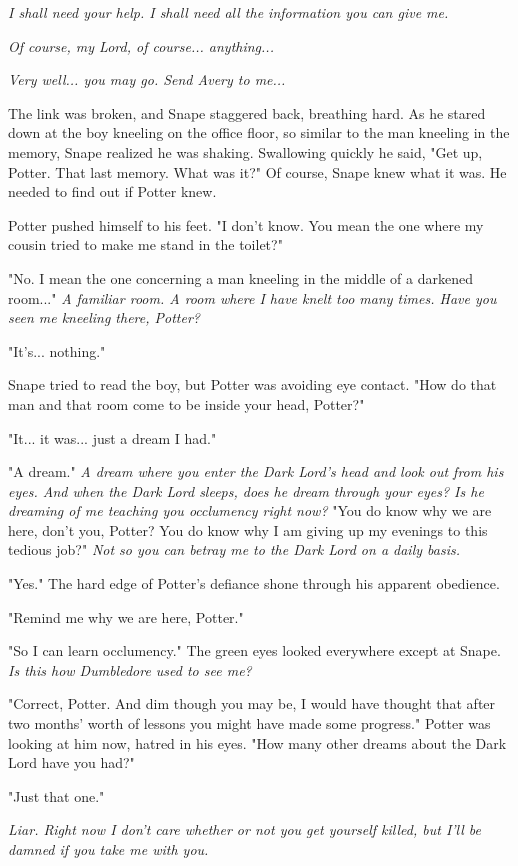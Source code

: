 \emph{I shall need your help. I shall need all the information you can give me.}

\emph{Of course, my Lord, of course... anything...}

\emph{Very well... you may go. Send Avery to me...}

The link was broken, and Snape staggered back, breathing hard. As he stared down at the boy kneeling on the office floor, so similar to the man kneeling in the memory, Snape realized he was shaking. Swallowing quickly he said, "Get up, Potter. That last memory. What was it?" Of course, Snape knew what it was. He needed to find out if Potter knew.

Potter pushed himself to his feet. "I don't know. You mean the one where my cousin tried to make me stand in the toilet?"

"No. I mean the one concerning a man kneeling in the middle of a darkened room..." \emph{A familiar room. A room where I have knelt too many times. Have you seen me kneeling there, Potter?}

"It's... nothing."

Snape tried to read the boy, but Potter was avoiding eye contact. "How do that man and that room come to be inside your head, Potter?"

"It... it was... just a dream I had."

"A dream." \emph{A dream where you enter the Dark Lord's head and look out from his eyes. And when the Dark Lord sleeps, does he dream through your eyes? Is he dreaming of me teaching you occlumency right now?} "You do know why we are here, don't you, Potter? You do know why I am giving up my evenings to this tedious job?" \emph{Not so you can betray me to the Dark Lord on a daily basis.}

"Yes." The hard edge of Potter's defiance shone through his apparent obedience.

"Remind me why we are here, Potter."

"So I can learn occlumency." The green eyes looked everywhere except at Snape. \emph{Is this how Dumbledore used to see me?}

"Correct, Potter. And dim though you may be, I would have thought that after two months' worth of lessons you might have made some progress." Potter was looking at him now, hatred in his eyes. "How many other dreams about the Dark Lord have you had?"

"Just that one."

\emph{Liar. Right now I don't care whether or not you get yourself killed, but I'll be damned if you take me with you.}

